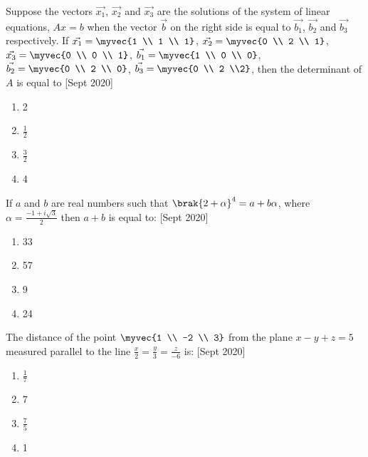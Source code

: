 
\iffalse
  \title{Sept:2020}
  \author{AI24BTECH11016}
  \section{mcq-single}
\fi
\item
	Suppose the vectors $\vec{x_1}$, $\vec{x_2}$ and $\vec{x_3}$ are the solutions of the system of linear equations, $Ax = b$ when the vector $\vec{b}$ on the right side is equal to $\vec{b_1}$, $\vec{b_2}$ and $\vec{b_3}$ respectively. If $\vec{x_1} = \myvec{1 \\ 1 \\ 1}$, $\vec{x_2} = \myvec{0 \\ 2 \\ 1}$, $\vec{x_3} = \myvec{0 \\ 0 \\ 1}$, $\vec{b_1} = \myvec{1 \\ 0 \\ 0}$, $\vec{b_2} = \myvec{0 \\ 2 \\ 0}$, $\vec{b_3} = \myvec{0 \\ 2 \\2}$, then the determinant of $A$ is equal to 
	\hfill [Sept 2020]
		\begin{enumerate}
			\item 2
			\item $\frac{1}{2}$
			\item $\frac{3}{2}$
			\item 4
		\end{enumerate}
	\item
	 If $a$ and $b$ are real numbers such that $\brak{2+\alpha}^{4} = a+b\alpha$, where $\alpha = \frac{-1+i\sqrt{3}}{2}$ then $a+b$ is equal to:
	 \hfill [Sept 2020]
	 	\begin{enumerate}
	 		\item 33
	 		\item 57
	 		\item 9
	 		\item 24
	 	\end{enumerate}
	\item
	The distance of the point $\myvec{1 \\ -2 \\ 3}$ from the plane $x-y+z = 5$ measured parallel to the line $\frac{x}{2} = \frac{y}{3} = \frac{z}{-6}$ is:
	\hfill [Sept 2020]
		\begin{enumerate}
			\item $\frac{1}{7}$
			\item 7
			\item $\frac{7}{5}$
			\item 1
		\end{enumerate}
